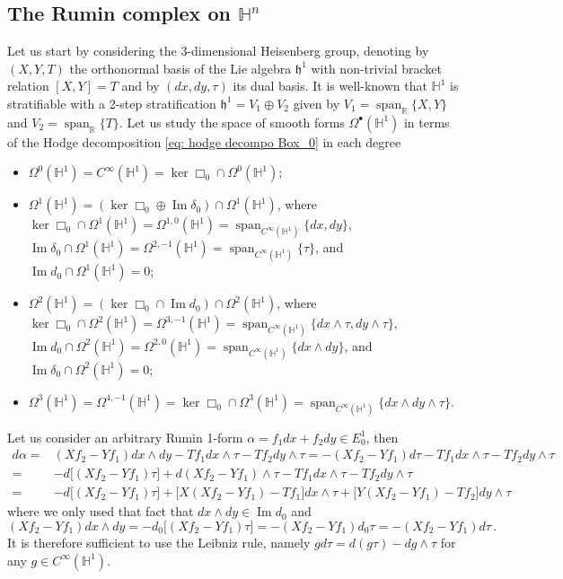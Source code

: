 \documentclass[dvipsnames]{amsart}
\theoremstyle{definition}
\theoremstyle{definition}
\numberwithin{equation}{section}
\newcommand{\R}{\mathbb{R}}
\renewcommand{\H}{\mathbb{H}}
\begin{document}
\subsection{The Rumin complex on $\H^n$}\label{subsection: Rumin complex Leibniz Hn} Let us start by considering the 3-dimensional Heisenberg group, denoting by $(X,Y,T)$ the orthonormal basis of the Lie algebra $\mathfrak{h}^1$ with non-trivial bracket relation $[X,Y]=T$ and by $(dx,dy,\tau)$ its dual basis. It is well-known that $\H^1$ is stratifiable with a 2-step stratification $\mathfrak{h}^1=V_1\oplus V_2$ given by $V_1=\operatorname{span}_\R\{X,Y\}$ and $V_2=\operatorname{span}_\R\{T\}$. Let us study the space of smooth forms $\Omega^\bullet(\H^1)$ in terms of the Hodge decomposition \eqref{eq: hodge decompo Box_0} in each degree
\begin{itemize}
    \item $\Omega^0(\H^1)=C^\infty(\H^1)=\ker\Box_0\cap\Omega^0(\H^1)$;
    \item $\Omega^1(\H^1)=(\ker\Box_0\oplus\operatorname{Im}\delta_0)\cap\Omega^1(\H^1)$, where $\ker\Box_0\cap\Omega^1(\H^1)=\Omega^{1,0}(\H^1)=\operatorname{span}_{C^\infty(\H^1)}\{dx,dy\}$, $\operatorname{Im}\delta_0\cap\Omega^1(\H^1)=\Omega^{2,-1}(\H^1)=\operatorname{span}_{C^\infty(\H^1)}\{\tau\}$, and $\operatorname{Im}d_0\cap\Omega^1(\H^1)=0$;
    \item $\Omega^{2}(\H^1)=(\ker\Box_0\cap\operatorname{Im}d_0)\cap\Omega^2(\H^1)$, where $\ker\Box_0\cap\Omega^2(\H^1)=\Omega^{3,-1}(\H^1)=\operatorname{span}_{C^\infty(\H^1)}\{dx\wedge\tau,dy\wedge\tau\}$, $\operatorname{Im}d_0\cap\Omega^2(\H^1)=\Omega^{2,0}(\H^1)=\operatorname{span}_{C^\infty(\H^1)}\{dx\wedge dy\}$, and $\operatorname{Im}\delta_0\cap\Omega^2(\H^1)=0$;
    \item $\Omega^3(\H^1)=\Omega^{4,-1}(\H^1)=\ker\Box_0\cap\Omega^3(\H^1)=\operatorname{span}_{C^\infty(\H^1)}\{dx\wedge
     dy\wedge\tau\}$.
\end{itemize}

Let us consider an arbitrary Rumin 1-form $\alpha=f_1dx+f_2dy\in E_0^1$, then
\begin{align*}
    d\alpha=&(Xf_2-Yf_1)dx\wedge dy-Tf_1dx\wedge\tau-Tf_2dy\wedge\tau=-(Xf_2-Yf_1)d\tau-Tf_1dx\wedge\tau-Tf_2dy\wedge\tau\\=&-d\big[(Xf_2-Yf_1)\tau\big]+d(Xf_2-Yf_1)\wedge \tau-Tf_1 dx\wedge\tau-Tf_2dy\wedge
    \tau\\=&-d\big[(Xf_2-Yf_1)\tau\big]+\big[X(Xf_2-Yf_1)-Tf_1\big]dx\wedge\tau+\big[Y(Xf_2-Yf_1)-Tf_2\big]dy\wedge
    \tau
\end{align*}
where we only used that fact that $dx\wedge dy\in\operatorname{Im}d_0$ and $$(Xf_2-Yf_1)dx\wedge dy=-d_0\big[(Xf_2-Yf_1)\tau\big]=-(Xf_2-Yf_1)d_0\tau=-(Xf_2-Yf_1)d\tau\,.$$ It is therefore sufficient to use the Leibniz rule, namely $gd\tau=d(g\tau)-dg\wedge\tau$ for any $g\in C^\infty(\H^1)$.
\end{document}
